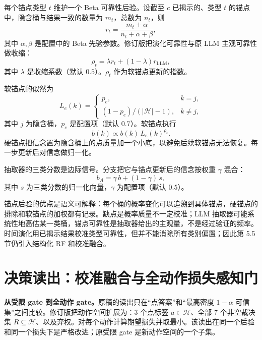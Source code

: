 每个锚点类型 $t$ 维护一个 Beta 可靠性后验。设截至 $c$ 已揭示的、类型 $t$ 的锚点中，隐含桶与结果一致的数量为 $m_t$，总数为 $n_t$，则
\begin{equation}
r_t=\frac{m_t+\alpha}{n_t+\alpha+\beta},
\end{equation}
其中 $\alpha,\beta$ 是配置中的 Beta 先验参数。修订版把演化可靠性与原 LLM 主观可靠性做收缩：
\begin{equation}
\rho_t=\lambda r_t+(1-\lambda)r_{\mathrm{LLM}},
\end{equation}
其中 $\lambda$ 是收缩系数（默认 $0.5$）。$\rho_t$ 作为软锚点更新的指数。

软锚点的似然为
\begin{equation}
L_e(k)=
\begin{cases}
p_e, & k=j,\\
(1-p_e)/(|\mathcal H|-1), & k\ne j,
\end{cases}
\end{equation}
其中 $j$ 为隐含桶，$p_e$ 是配置项（默认 $0.7$）。软锚点执行
\begin{equation}
b(k)\propto b(k)\,L_e(k)^{\rho_t}.
\end{equation}
硬锚点把信念置为隐含桶上的点质量加一个小底，以避免后续软锚点无法恢复。每一步更新后对信念做归一化。

抽取器的三类分数是边际信号。分支把它与锚点更新后的信念按权重 $\gamma$ 混合：
\begin{equation}
b_A=\gamma\,b+(1-\gamma)\,s,
\end{equation}
其中 $s$ 为三类分数的归一化向量，$\gamma$ 为配置项（默认 $0.5$）。

锚点后验的优点是语义可解释：每个桶的概率变化可以追溯到具体锚点，硬锚点的排除和软锚点的加权都有记录。缺点是概率质量不一定校准；LLM 抽取器可能系统性地高估某一类桶，锚点可靠性是抽取器给出的主观量，不是经过验证的频率。时间演化用已揭示结果校准类型可靠性，但并不能消除所有类别偏置；因此第 5.5 节仍引入结构化 RF 和校准融合。

\section{决策读出：校准融合与全动作损失感知门}

\begin{revbox}
\noindent\textbf{从受限 gate 到全动作 gate。}原稿的读出只在“点答案”和“最高密度 $1-\alpha$ 可信集”之间比较。修订版把动作空间扩展为：3 个点标签 $a\in\mathcal H$、全部 7 个非空裁决集 $R\subseteq\mathcal H$、以及弃权。对每个动作计算期望损失并取最小。该读出在同一个后验和同一个损失下是严格改进；原受限 gate 是新动作空间的一个子集。
\end{revbox}

